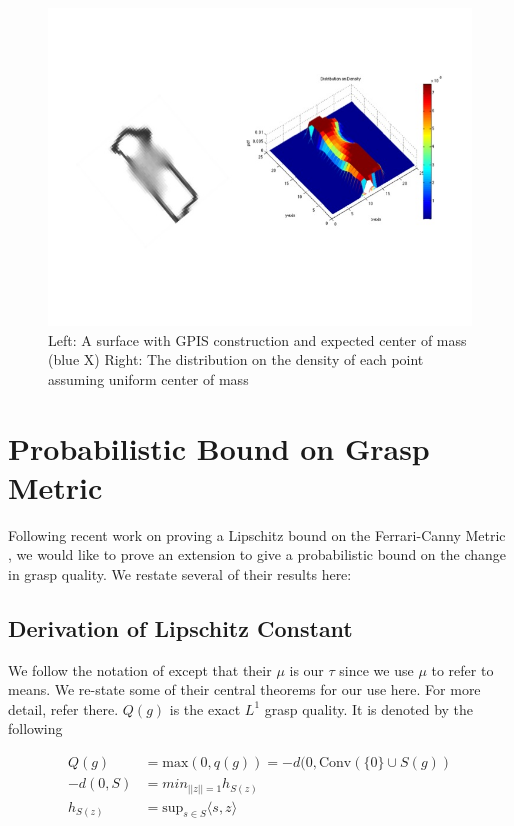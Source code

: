 \documentclass[letterpaper, 10 pt, conference]{ieeeconf}  %
\begin{document}
\begin{figure}[ht!]
\centering
\includegraphics[scale = 0.3]{figures/Slide6.jpg}
\caption{Left: A surface with GPIS construction and expected center of mass (blue X)
Right: The distribution on the density of each point assuming uniform center of mass}
\vspace*{-10pt}
\label{fig:GPIS_MASS}
\end{figure}

\section{Probabilistic Bound on Grasp Metric}
\label{sec:bound}
Following recent work on proving a Lipschitz bound on the Ferrari-Canny Metric \cite{pokorny2013classical}, we would like to prove an extension to give a probabilistic bound on the change in grasp quality.
We restate several of their results here:

\subsection{Derivation of Lipschitz Constant }

We follow the notation of \cite{pokorny2013classical} except that their $\mu$ is our $\tau$ since we use $\mu$ to refer to means.  
We re-state some of their central theorems for our use here.
For more detail, refer there.
$Q(g)$ is the exact $L^1$ grasp quality.
It is denoted by the following 

\begin{align}
  Q(g) &= \mbox{max}(0,q(g)) = -d(0,\mbox{Conv}(\{0\} \cup S(g))\\
-d(0,S) &= min_{||z|| = 1} h_{S(z)}\\
h_{S(z)} &= \mbox{sup}_{s\in S}\langle s,z\rangle\\
\end{align}
\end{document}
